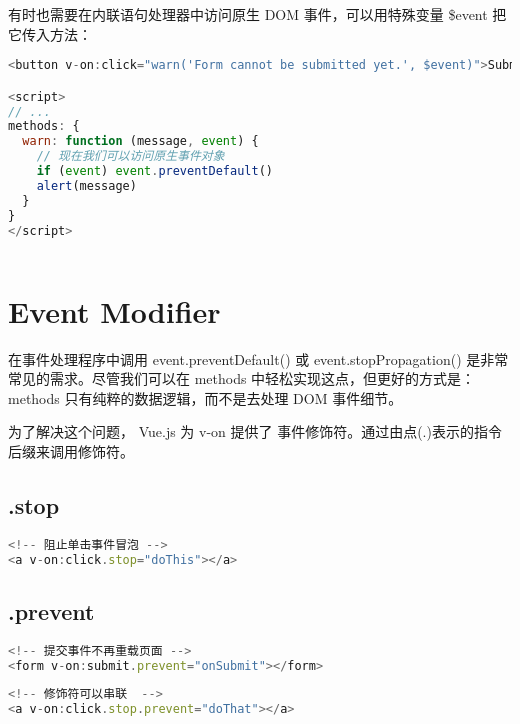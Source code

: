 有时也需要在内联语句处理器中访问原生 DOM 事件，可以用特殊变量 \$event 把它传入方法：

\begin{lstlisting}[language=JavaScript]
<button v-on:click="warn('Form cannot be submitted yet.', $event)">Submit</button>

<script>
// ...
methods: {
  warn: function (message, event) {
    // 现在我们可以访问原生事件对象
    if (event) event.preventDefault()
    alert(message)
  }
}
</script>
\end{lstlisting}



\begin{lstlisting}[language=JavaScript]

\end{lstlisting}


\section{Event Modifier}


在事件处理程序中调用 event.preventDefault() 或 event.stopPropagation() 是非常常见的需求。尽管我们可以在 methods 中轻松实现这点，但更好的方式是：methods 只有纯粹的数据逻辑，而不是去处理 DOM 事件细节。

为了解决这个问题， Vue.js 为 v-on 提供了 事件修饰符。通过由点(.)表示的指令后缀来调用修饰符。

\subsection{.stop}

\begin{lstlisting}[language=JavaScript]
<!-- 阻止单击事件冒泡 -->
<a v-on:click.stop="doThis"></a>
\end{lstlisting}

\subsection{.prevent}

\begin{lstlisting}[language=JavaScript]
<!-- 提交事件不再重载页面 -->
<form v-on:submit.prevent="onSubmit"></form>
\end{lstlisting}


\begin{lstlisting}[language=JavaScript]
<!-- 修饰符可以串联  -->
<a v-on:click.stop.prevent="doThat"></a>
\end{lstlisting}

